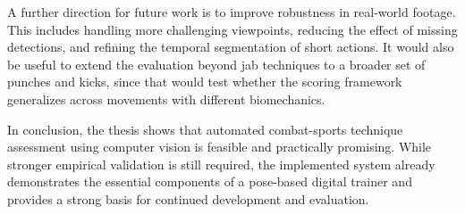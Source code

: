 \documentclass[12pt]{article}
\begin{document}
A further direction for future work is to improve robustness in real-world footage. This includes handling more challenging viewpoints, reducing the effect of missing detections, and refining the temporal segmentation of short actions. It would also be useful to extend the evaluation beyond jab techniques to a broader set of punches and kicks, since that would test whether the scoring framework generalizes across movements with different biomechanics.

In conclusion, the thesis shows that automated combat-sports technique assessment using computer vision is feasible and practically promising. While stronger empirical validation is still required, the implemented system already demonstrates the essential components of a pose-based digital trainer and provides a strong basis for continued development and evaluation.

\printbibliography
\end{document}
